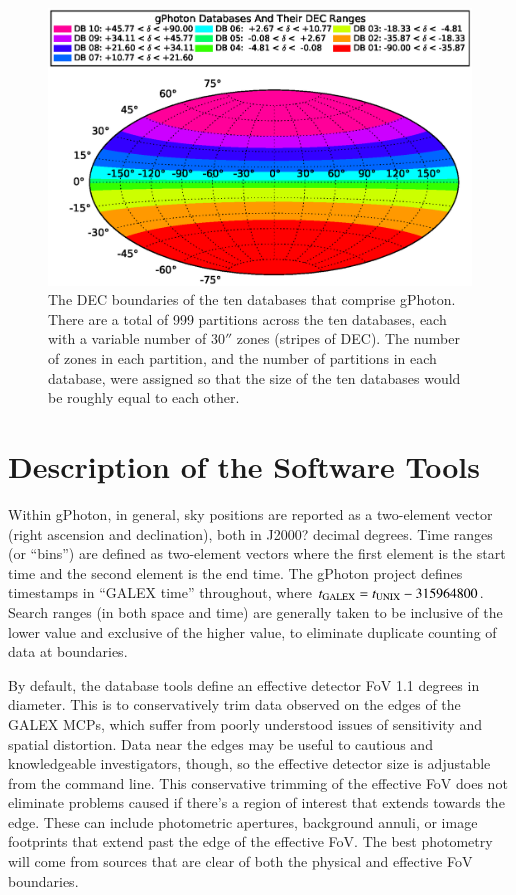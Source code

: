 \documentclass[5p]{elsarticle}
\begin{document}
\begin{figure}
\includegraphics[scale=0.48]{FigDBDist.eps}
\caption{The DEC boundaries of the ten databases that comprise gPhoton.  There are a total of 999 partitions across the ten databases, each with a variable number of $30''$ zones (stripes of DEC).  The number of zones in each partition, and the number of partitions in each database, were assigned so that the size of the ten databases would be roughly equal to each other. \label{dbdist}}
\end{figure}

\section{Description of the Software Tools}
\label{softwaretools}
Within gPhoton, in general, sky positions are reported as a two-element vector (right ascension and declination), both in {\color{red}J2000?} decimal degrees. Time ranges (or ``bins'') are defined as two-element vectors where the first element is the start time and the second element is the end time. The gPhoton project defines timestamps in ``GALEX time'' throughout, where $t_{\rm{GALEX}} = t_{\rm{UNIX}} - 315964800$. Search ranges (in both space and time) are generally taken to be inclusive of the lower value and exclusive of the higher value, to eliminate duplicate counting of data at boundaries.

By default, the database tools define an effective detector FoV 1.1 degrees in diameter. This is to conservatively trim data observed on the edges of the GALEX MCPs, which suffer from poorly understood issues of sensitivity and spatial distortion. Data near the edges may be useful to cautious and knowledgeable investigators, though, so the effective detector size is adjustable from the command line. This conservative trimming of the effective FoV does not eliminate problems caused if there's a region of interest that extends towards the edge.  These can include photometric apertures, background annuli, or image footprints that extend past the edge of the effective FoV.  The best photometry will come from sources that are clear of both the physical and effective FoV boundaries.
\end{document}

